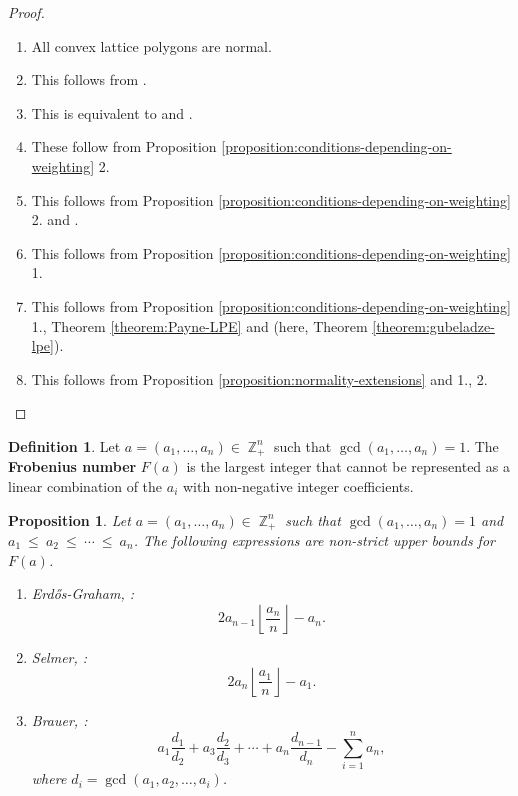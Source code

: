 \documentclass[a4paper,11pt]{amsart}
\theoremstyle{plain}
\newtheorem{proposition}[theorem]{Proposition}
\theoremstyle{definition}
\newtheorem{definition}[theorem]{Definition}
\theoremstyle{remark}
\DeclareMathOperator{\ZZ}{\mathbb{Z}}
\begin{document}
\begin{proof}
    \begin{enumerate}[1.]
        \item All convex lattice polygons are normal.
        \item This follows from \cite{Ogata:2005}.
        \item This is equivalent to \cite[Proposition 2.1 (c)]{BrunsGubeladze:1999} and \cite[Proposition 2.4 (b)]{BrunsGubeladze:1999}.
        \item[4., 5.] These follow from Proposition \ref{proposition:conditions-depending-on-weighting} 2.
        \item[6.] This follows from Proposition \ref{proposition:conditions-depending-on-weighting} 2. and \cite[Proposition 2.4 (c)]{BrunsGubeladze:1999}.
        \item[7.] This follows from Proposition \ref{proposition:conditions-depending-on-weighting} 1.
        \item[8.] This follows from Proposition \ref{proposition:conditions-depending-on-weighting} 1., Theorem \ref{theorem:Payne-LPE} and \cite[Theorem 1.3]{Gubeladze:2012} (here, Theorem \ref{theorem:gubeladze-lpe}).
        \item[9.] This follows from Proposition \ref{proposition:normality-extensions} and 1., 2.
    \end{enumerate}
\end{proof}

\begin{definition}
    Let $a = (a_1, \ldots, a_n) \in \ZZ_+^n$ such that $\gcd(a_1, \ldots, a_n) = 1$. The \textbf{Frobenius number} $F(a)$ is the largest integer that cannot be represented as a linear combination of the $a_i$ with non-negative integer coefficients.
\end{definition}

\begin{proposition}\label{proposition:bounds}
    Let $a = (a_1, \ldots, a_n) \in \ZZ_+^n$ such that $\gcd(a_1, \ldots, a_n) = 1$ and $a_1~\leq~a_2~\leq~\cdots~\leq~a_n$. The following expressions are non-strict upper bounds for $F(a)$.
    \begin{enumerate}[1.]
        \item Erdős-Graham, \cite[Theorem 1]{ErdosGraham:1972}:
        \[
        2a_{n - 1} \left  \lfloor \frac{a_n}{n} \right \rfloor - a_n.
        \]
        \item Selmer, \cite{Selmer:1977}:
        \[
        2a_n \left  \lfloor \frac{a_1}{n} \right \rfloor - a_1.
        \]
        \item Brauer, \cite{Brauer:1942}:
        \[
        a_1 \frac{d_1}{d_2} + a_3 \frac{d_2}{d_3} + \cdots + a_n \frac{d_{n - 1}}{d_n} - \sum_{i = 1}^n a_n,
        \]
        where $d_i = \gcd(a_1, a_2, \ldots, a_i)$.
    \end{enumerate}
\end{proposition}
\end{document}

